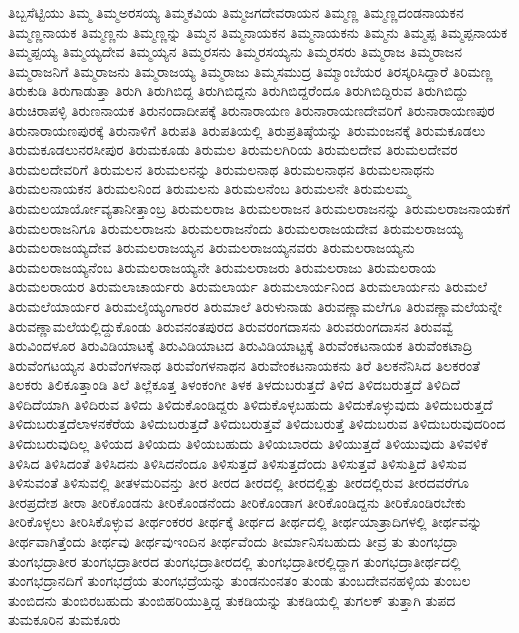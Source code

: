 {ತಿಬ್ಬಸೆಟ್ಟಿಯು
ತಿಮ್ಮ
ತಿಮ್ಮಅರಸಯ್ಯ
ತಿಮ್ಮಕವಿಯ
ತಿಮ್ಮಜಗದೇವರಾಯನ
ತಿಮ್ಮಣ್ಣ
ತಿಮ್ಮಣ್ಣದಂಡನಾಯಕನ
ತಿಮ್ಮಣ್ಣನಾಯಕ
ತಿಮ್ಮಣ್ಣನು
ತಿಮ್ಮಣ್ಣನ್ನು
ತಿಮ್ಮನ
ತಿಮ್ಮನಾಯಕನ
ತಿಮ್ಮನಾಯಕನು
ತಿಮ್ಮನು
ತಿಮ್ಮಪ್ಪ
ತಿಮ್ಮಪ್ಪನಾಯಕ
ತಿಮ್ಮಪ್ಪಯ್ಯ
ತಿಮ್ಮಯ್ಯದೇವ
ತಿಮ್ಮಯ್ಯನ
ತಿಮ್ಮರಸನು
ತಿಮ್ಮರಸಯ್ಯನು
ತಿಮ್ಮರಸರು
ತಿಮ್ಮರಾಜ
ತಿಮ್ಮರಾಜನ
ತಿಮ್ಮರಾಜನಿಗೆ
ತಿಮ್ಮರಾಜನು
ತಿಮ್ಮರಾಜಯ್ಯ
ತಿಮ್ಮರಾಜು
ತಿಮ್ಮಸಮುದ್ರ
ತಿಮ್ಮಾಂಬೆಯರ
ತಿರಸ್ಕರಿಸಿದ್ದಾರೆ
ತಿರಿಮಣ್ಣ
ತಿರುಕುಡಿ
ತಿರುಗಾಡುತ್ತಾ
ತಿರುಗಿ
ತಿರುಗಿಬಿದ್ದ
ತಿರುಗಿಬಿದ್ದನು
ತಿರುಗಿಬಿದ್ದರೆಂದೂ
ತಿರುಗಿಬಿದ್ದಿರುವ
ತಿರುಗಿಬಿದ್ದು
ತಿರುಚಿರಾಪಳ್ಳಿ
ತಿರುಣನಾಯಕ
ತಿರುನಂದಾದೀಪಕ್ಕೆ
ತಿರುನಾರಾಯಣ
ತಿರುನಾರಾಯಣದೇವರಿಗೆ
ತಿರುನಾರಾಯಣಪುರ
ತಿರುನಾರಾಯಣಪುರಕ್ಕೆ
ತಿರುನಾಳಿಗೆ
ತಿರುಪತಿ
ತಿರುಪತಿಯಲ್ಲಿ
ತಿರುಪ್ರತಿಷ್ಠೆಯನ್ನು
ತಿರುಮಂಜನಕ್ಕೆ
ತಿರುಮಕೂಡಲು
ತಿರುಮಕೂಡಲುನರಸೀಪುರ
ತಿರುಮಕೂಡು
ತಿರುಮಲ
ತಿರುಮಲಗಿರಿಯ
ತಿರುಮಲದೇವ
ತಿರುಮಲದೇವರ
ತಿರುಮಲದೇವರಿಗೆ
ತಿರುಮಲನ
ತಿರುಮಲನನ್ನು
ತಿರುಮಲನಾಥ
ತಿರುಮಲನಾಥನ
ತಿರುಮಲನಾಥನು
ತಿರುಮಲನಾಯಕನ
ತಿರುಮಲನಿಂದ
ತಿರುಮಲನು
ತಿರುಮಲನೆಂಬ
ತಿರುಮಲನೇ
ತಿರುಮಲಮ್ಮ
ತಿರುಮಲಯಾರ್ಯೋವ್ಯತಾನೀತ್ತಾಂಬ್ರ
ತಿರುಮಲರಾಜ
ತಿರುಮಲರಾಜನ
ತಿರುಮಲರಾಜನನ್ನು
ತಿರುಮಲರಾಜನಾಯಕಗೆ
ತಿರುಮಲರಾಜನಿಗೂ
ತಿರುಮಲರಾಜನು
ತಿರುಮಲರಾಜನೆಂದು
ತಿರುಮಲರಾಜಯದೇವ
ತಿರುಮಲರಾಜಯ್ಯ
ತಿರುಮಲರಾಜಯ್ಯದೇವ
ತಿರುಮಲರಾಜಯ್ಯನ
ತಿರುಮಲರಾಜಯ್ಯನವರು
ತಿರುಮಲರಾಜಯ್ಯನು
ತಿರುಮಲರಾಜಯ್ಯನೆಂಬ
ತಿರುಮಲರಾಜಯ್ಯನೇ
ತಿರುಮಲರಾಜರು
ತಿರುಮಲರಾಜು
ತಿರುಮಲರಾಯ
ತಿರುಮಲರಾಯರ
ತಿರುಮಲಾಚಾರ್ಯರು
ತಿರುಮಲಾರ್ಯ
ತಿರುಮಲಾರ್ಯನಿಂದ
ತಿರುಮಲಾರ್ಯನು
ತಿರುಮಲೆ
ತಿರುಮಲೆಯಾರ್ಯರ
ತಿರುಮಲೈಯ್ಯಂಗಾರರ
ತಿರುಮಾಲೆ
ತಿರುಳುನಾಡು
ತಿರುವಣ್ಣಾಮಲೆಗೂ
ತಿರುವಣ್ಣಾಮಲೆಯನ್ನೇ
ತಿರುವಣ್ಣಾಮಲೆಯಲ್ಲಿದ್ದುಕೊಂಡು
ತಿರುವನಂತಪುರದ
ತಿರುವರಂಗದಾಸನು
ತಿರುವರುಂಗದಾಸನ
ತಿರುವವ್ವೆ
ತಿರುವಿಂದಳೂರ
ತಿರುವಿಡಿಯಾಟಕ್ಕೆ
ತಿರುವಿಡಿಯಾಟದ
ತಿರುವಿಡಿಯಾಟ್ಟಕ್ಕೆ
ತಿರುವೆಂಕಟನಾಯಕ
ತಿರುವೆಂಕಟಾದ್ರಿ
ತಿರುವೆಂಗಟಯ್ಯನ
ತಿರುವೆಂಗಳನಾಥ
ತಿರುವೆಂಗಳನಾಥನ
ತಿರುವೇಂಕಟನಾಯಕನು
ತಿರೆ
ತಿಲಕನೆನಿಸಿದ
ತಿಲಕರಂತೆ
ತಿಲಕರು
ತಿಲಿಕೂತ್ತಾಂಡಿ
ತಿಲೆ
ತಿಲ್ಲೆಕೂತ್ತ
ತಿಳಂಕಂಗೀ
ತಿಳಕ
ತಿಳದುಬರುತ್ತದೆ
ತಿಳಿದ
ತಿಳಿದಬರುತ್ತದೆ
ತಿಳಿದಿದೆ
ತಿಳಿದಿದೆಯಾಗಿ
ತಿಳಿದಿರುವ
ತಿಳಿದು
ತಿಳಿದುಕೊಂಡಿದ್ದರು
ತಿಳಿದುಕೊಳ್ಳಬಹುದು
ತಿಳಿದುಕೊಳ್ಳುವುದು
ತಿಳಿದುಬರುತ್ತದೆ
ತಿಳಿದುಬರುತ್ತದೆಲಾಳನಕೆರೆಯ
ತಿಳಿದುಬರುತ್ತದೆೆ
ತಿಳಿದುಬರುತ್ತವೆ
ತಿಳಿದುಬರುತ್ತೆ
ತಿಳಿದುಬರುವ
ತಿಳಿದುಬರುವುದರಿಂದ
ತಿಳಿದುಬರುವುದಿಲ್ಲ
ತಿಳಿಯದ
ತಿಳಿಯದು
ತಿಳಿಯಬಹುದು
ತಿಳಿಯಬಾರದು
ತಿಳಿಯುತ್ತದೆ
ತಿಳಿಯುವುದು
ತಿಳಿವಳಿಕೆ
ತಿಳಿಸಿದ
ತಿಳಿಸಿದಂತೆ
ತಿಳಿಸಿದನು
ತಿಳಿಸಿದನೆಂದೂ
ತಿಳಿಸುತ್ತದೆ
ತಿಳಿಸುತ್ತದೆಂದು
ತಿಳಿಸುತ್ತವೆ
ತಿಳಿಸುತ್ತಿದೆ
ತಿಳಿಸುವ
ತಿಳಿಸುವಂತೆ
ತಿಳಿಸುವಲ್ಲಿ
ತೀತಳಮರಿವನ್ತು
ತೀರ
ತೀರದ
ತೀರದಲ್ಲಿ
ತೀರದಲ್ಲಿತ್ತು
ತೀರದಲ್ಲಿರುವ
ತೀರದವರೆಗೂ
ತೀರಪ್ರದೇಶ
ತೀರಾ
ತೀರಿಕೊಂಡನು
ತೀರಿಕೊಂಡನೆಂದು
ತೀರಿಕೊಂಡಾಗ
ತೀರಿಕೊಂಡಿದ್ದನು
ತೀರಿಕೊಂಡಿರಬೇಕು
ತೀರಿಕೊಳ್ಳಲು
ತೀರಿಸಿಕೊಳ್ಳುವ
ತೀರ್ಥಂಕರರ
ತೀರ್ಥಕ್ಕೆ
ತೀರ್ಥದ
ತೀರ್ಥದಲ್ಲಿ
ತೀರ್ಥಯಾತ್ರಾದಿಗಳಲ್ಲಿ
ತೀರ್ಥವನ್ನು
ತೀರ್ಥವಾಗಿತ್ತೆಂದು
ತೀರ್ಥವು
ತೀರ್ಥವುಇಂದಿನ
ತೀರ್ಥವೆಂದು
ತೀರ್ಮಾನಿಸಬಹುದು
ತೀವ್ರ
ತು
ತುಂಗಭದ್ರಾ
ತುಂಗಭದ್ರಾತೀರ
ತುಂಗಭದ್ರಾತೀರದ
ತುಂಗಭದ್ರಾತೀರದಲ್ಲಿ
ತುಂಗಭದ್ರಾತೀರಲ್ಲಿದ್ದಾಗ
ತುಂಗಭದ್ರಾತೀರ್ಥದಲ್ಲಿ
ತುಂಗಭದ್ರಾನದಿಗೆ
ತುಂಗಭದ್ರೆಯ
ತುಂಗಭದ್ರೆಯನ್ನು
ತುಂಡನುಂನತಂ
ತುಂಡು
ತುಂಬದೇವನಹಳ್ಳಿಯ
ತುಂಬಲ
ತುಂಬಿದನು
ತುಂಬಿರಬಹುದು
ತುಂಬಿಹರಿಯುತ್ತಿದ್ದ
ತುಕಡಿಯನ್ನು
ತುಕಡಿಯಲ್ಲಿ
ತುಗಲಕ್
ತುತ್ತಾಗಿ
ತುಪದ
ತುಮಕೂರಿನ
ತುಮಕೂರು
}
